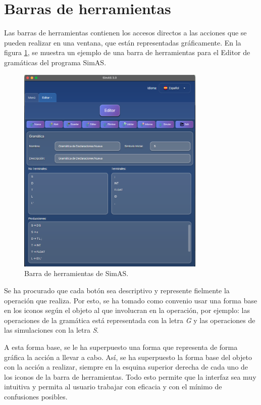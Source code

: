 \section{Barras de herramientas}

Las barras de herramientas contienen los accesos directos a las acciones que se pueden realizar en una ventana, que están representadas gráficamente. En la figura \ref{fig:d2}, se muestra un ejemplo de una barra de herramientas para el Editor de gramáticas del programa SimAS.

\begin{figure}[htp]
\centering
	\includegraphics[width=0.8\textwidth]{figuras2/editor/editor.png}
	\caption{Barra de herramientas de SimAS.}
	\label{fig:d2}
\end{figure}

  Se ha procurado que cada botón sea descriptivo y represente fielmente la operación que realiza. Por esto, se ha tomado como convenio usar una forma base en los iconos según el objeto al que involucran en la operación, por ejemplo: las operaciones de la gramática está representada con la letra \textit{G} y las operaciones de las simulaciones con la letra \textit{S}.

A esta forma base, se le ha superpuesto una forma que representa de forma gráfica la acción a llevar a cabo. Así, se ha superpuesto la forma base del objeto con la acción a realizar, siempre en la esquina superior derecha de cada uno de los iconos de la barra de herramientas. Todo esto permite que la interfaz sea muy intuitiva y permita al usuario trabajar con eficacia y con el mínimo de confusiones posibles.
  

